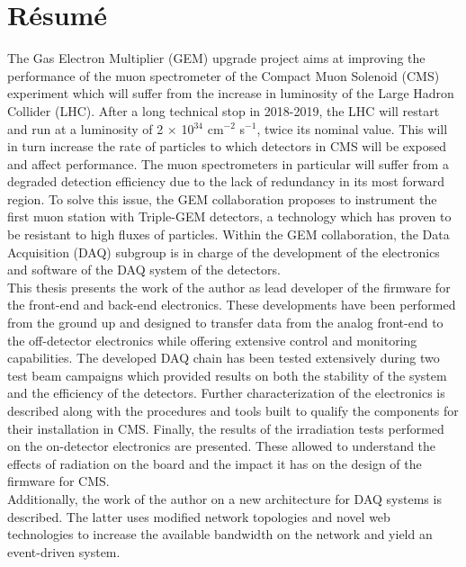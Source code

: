 \chapter*{Résumé}



The Gas Electron Multiplier (GEM) upgrade project aims at improving the performance of the muon spectrometer of the Compact Muon Solenoid (CMS) experiment which will suffer from the increase in luminosity of the Large Hadron Collider (LHC). After a long technical stop in 2018-2019, the LHC will restart and run at a luminosity of 2 $\times$ 10$^{34}$ cm$^{-2}$ s$^{-1}$, twice its nominal value. This will in turn increase the rate of particles to which detectors in CMS will be exposed and affect performance. The muon spectrometers in particular will suffer from a degraded detection efficiency due to the lack of redundancy in its most forward region. To solve this issue, the GEM collaboration proposes to instrument the first muon station with Triple-GEM detectors, a technology which has proven to be resistant to high fluxes of particles. Within the GEM collaboration, the Data Acquisition (DAQ) subgroup is in charge of the development of the electronics and software of the DAQ system of the detectors. \\

This thesis presents the work of the author as lead developer of the firmware for the front-end and back-end electronics. These developments have been performed from the ground up and designed to transfer data from the analog front-end to the off-detector electronics while offering extensive control and monitoring capabilities. The developed DAQ chain has been tested extensively during two test beam campaigns which provided results on both the stability of the system and the efficiency of the detectors. Further characterization of the electronics is described along with the procedures and tools built to qualify the components for their installation in CMS. Finally, the results of the irradiation tests performed on the on-detector electronics are presented. These allowed to understand the effects of radiation on the board and the impact it has on the design of the firmware for CMS. \\

Additionally, the work of the author on a new architecture for DAQ systems is described. The latter uses modified network topologies and novel web technologies to increase the available bandwidth on the network and yield an event-driven system.
